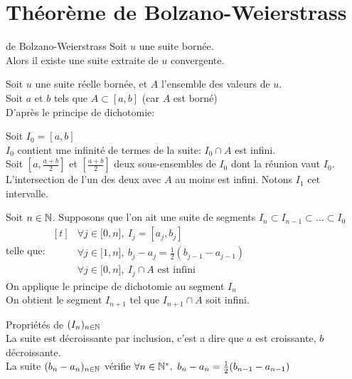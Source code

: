 \documentclass[12pt,twoside,a4paper]{article}
\begin{document}
	\section{Th\'eor\`eme de Bolzano-Weierstrass}
		\begin{theo}{de Bolzano-Weierstrass}
			Soit $u$ une suite born\'ee.\\
			Alors il existe une suite extraite de $u$ convergente.
		\end{theo}
		\begin{preuve}
			Soit $u$ une suite r\'eelle born\'ee, et $A$ l'ensemble des valeurs de $u$.\\
			Soit $a$ et $b$ tels que $A\subset[a,b]$ (car $A$ est born\'e)\\
			D'apr\`es le principe de dichotomie:
			\begin{liste}
				\item Soit $I_0=[a,b]$\\
					$I_0$ contient une infinit\'e de termes de la suite: $I_0\cap A$ est infini.\\
					Soit $\left[a,\frac{a+b}{2}\right]$ et $\left[\frac{a+b}{2}\right]$ deux sous-ensembles de $I_0$ dont la r\'eunion vaut $I_0$.\\
					L'intersection de l'un des deux avec $A$ au moins est infini. Notons $I_1$ cet intervalle.\\
				\item Soit $n\in\mathbb{N}$. Supposons que l'on ait une suite de segments $I_n\subset I_{n-1}\subset...\subset I_0$\\
					telle que: $\begin{aligned}[t]
					&\forall j\in\lbrack0,n\rbrack,\ I_j=[a_j,b_j]\\
					&\forall j\in\lbrack1,n\rbrack,\ b_j-a_j=\frac{1}{2}(b_{j-1}-a_{j-1})\\
					&\forall j\in\lbrack0,n\rbrack,\ I_j\cap A\text{ est infini}
					\end{aligned}$\\
					On applique le principe de dichotomie au segment $I_n$\\
					On obtient le segment $I_{n+1}$ tel que $I_{n+1}\cap A$ soit infini.
				\item Propri\'et\'es de $(I_n)_{n\in\mathbb{N}}$\\
					La suite est d\'ecroissante par inclusion, c'est a dire que $a$ est croissante, $b$ d\'ecroissante.\\
					La suite $(b_n-a_n)_{n\in\mathbb{N}}$ v\'erifie $\forall n\in\N^*,\ b_n-a_n=\frac{1}{2}(b_{n-1}-a_{n-1})$\\

\end{liste}
\end{preuve}
\end{document}
